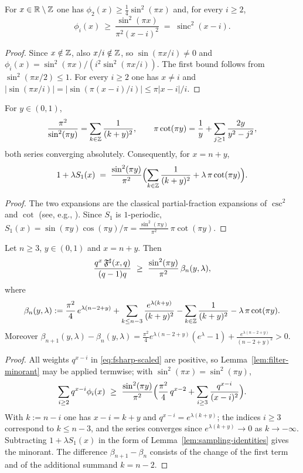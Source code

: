 \begin{lemma}\label{lem:filter-minorant}
For $x\in\mathbb{R}\setminus\mathbb{Z}$ one has $\phi_2(x)\ge\tfrac14\sin^2(\pi x)$ and, for every $i\ge2$,
\[
\phi_i(x)\ \ge\ \frac{\sin^2(\pi x)}{\pi^2(x-i)^2}\;=\;\operatorname{sinc}^2(x-i).
\]
\end{lemma}
\begin{proof}
Since $x\notin\mathbb{Z}$, also $x/i\notin\mathbb{Z}$, so $\sin(\pi x/i)\neq0$ and $\phi_i(x)=\sin^2(\pi x)/(i^2\sin^2(\pi x/i))$. The first bound follows from $\sin^2(\pi x/2)\le1$. For every $i\ge2$ one has $x\neq i$ and $|\sin(\pi x/i)|=|\sin(\pi(x-i)/i)|\le\pi|x-i|/i$.
\end{proof}

\begin{lemma}\label{lem:sampling-identities}
For $y\in(0,1)$,
\[
\frac{\pi^2}{\sin^2(\pi y)}=\sum_{k\in\mathbb{Z}}\frac{1}{(k+y)^2},\qquad
\pi\cot(\pi y)=\frac1y+\sum_{j\ge1}\frac{2y}{y^2-j^2},
\]
both series converging absolutely. Consequently, for $x=n+y$,
\[
1+\lambda S_1(x)\;=\;\frac{\sin^2(\pi y)}{\pi^2}\Bigl(\sum_{k\in\mathbb{Z}}\frac{1}{(k+y)^2}+\lambda\,\pi\cot(\pi y)\Bigr).
\]
\end{lemma}
\begin{proof}
The two expansions are the classical partial-fraction expansions of $\csc^2$ and $\cot$ (see, e.g., \cite{ahlfors1979}). Since $S_1$ is $1$-periodic, $S_1(x)=\sin(\pi y)\cos(\pi y)/\pi=\frac{\sin^2(\pi y)}{\pi^2}\,\pi\cot(\pi y)$.
\end{proof}

\begin{lemma}\label{lem:beta-minorant}
Let $n\ge3$, $y\in(0,1)$ and $x=n+y$. Then
\[
\frac{q^{x}\,\Fsharp(x,q)}{(q-1)q}\ \ge\ \frac{\sin^2(\pi y)}{\pi^2}\,\beta_n(y,\lambda),
\]
where
\[
\beta_n(y,\lambda):=\frac{\pi^2}{4}\,e^{\lambda(n-2+y)}+\sum_{k\le n-3}\frac{e^{\lambda(k+y)}}{(k+y)^2}-\sum_{k\in\mathbb{Z}}\frac{1}{(k+y)^2}-\lambda\,\pi\cot(\pi y).
\]
Moreover $\beta_{n+1}(y,\lambda)-\beta_n(y,\lambda)=\frac{\pi^2}{4}e^{\lambda(n-2+y)}(e^{\lambda}-1)+\frac{e^{\lambda(n-2+y)}}{(n-2+y)^2}>0$.
\end{lemma}
\begin{proof}
All weights $q^{x-i}$ in \eqref{eq:fsharp-scaled} are positive, so Lemma~\ref{lem:filter-minorant} may be applied termwise; with $\sin^2(\pi x)=\sin^2(\pi y)$,
\[
\sum_{i\ge2}q^{x-i}\phi_i(x)\ \ge\ \frac{\sin^2(\pi y)}{\pi^2}\Bigl(\frac{\pi^2}{4}\,q^{x-2}+\sum_{i\ge3}\frac{q^{x-i}}{(x-i)^2}\Bigr).
\]
With $k:=n-i$ one has $x-i=k+y$ and $q^{x-i}=e^{\lambda(k+y)}$; the indices $i\ge3$ correspond to $k\le n-3$, and the series converges since $e^{\lambda(k+y)}\to0$ as $k\to-\infty$. Subtracting $1+\lambda S_1(x)$ in the form of Lemma~\ref{lem:sampling-identities} gives the minorant. The difference $\beta_{n+1}-\beta_n$ consists of the change of the first term and of the additional summand $k=n-2$.
\end{proof}

